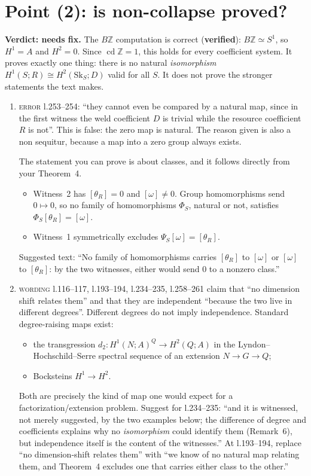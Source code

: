 \documentclass[11pt]{article}
\newcommand{\Z}{\mathbb{Z}}
\newcommand{\iss}[1]{\textsc{#1}}
\begin{document}
\section{Point (2): is non-collapse proved?}
\textbf{Verdict: needs fix.} The $B\Z$ computation is correct (\textbf{verified}): $B\Z\simeq
S^1$, so $H^1=A$ and $H^2=0$. Since $\operatorname{cd}\Z=1$, this holds for every coefficient
system. It proves exactly one thing: there is no natural \emph{isomorphism}
$H^1(S;R)\cong H^2(\mathrm{Sk}_S;D)$ valid for all $S$. It does not prove the stronger statements
the text makes.

\begin{enumerate}[label=\textbf{2.\arabic*},leftmargin=*]
\item \iss{error} l.253--254: ``they cannot even be compared by a natural map, since in the first
witness the weld coefficient $D$ is trivial while the resource coefficient $R$ is not''. This is
false: the zero map is natural. The reason given is also a non sequitur, because a map into a zero
group always exists.

The statement you can prove is about classes, and it follows directly from your Theorem~4.
\begin{itemize}[leftmargin=1.2em]
\item Witness~2 has $[\theta_R]=0$ and $[\omega]\ne0$. Group homomorphisms send $0\mapsto0$, so no
family of homomorphisms $\Phi_S$, natural or not, satisfies $\Phi_S[\theta_R]=[\omega]$.
\item Witness~1 symmetrically excludes $\Psi_S[\omega]=[\theta_R]$.
\end{itemize}
Suggested text: ``No family of homomorphisms carries $[\theta_R]$ to $[\omega]$ or $[\omega]$ to
$[\theta_R]$: by the two witnesses, either would send $0$ to a nonzero class.''

\item \iss{wording} l.116--117, l.193--194, l.234--235, l.258--261 claim that ``no dimension shift
relates them'' and that they are independent ``because the two live in different degrees''.
Different degrees do not imply independence. Standard degree-raising maps exist:
\begin{itemize}[leftmargin=1.2em]
\item the transgression $d_2\colon H^1(N;A)^Q\to H^2(Q;A)$ in the Lyndon--Hochschild--Serre
spectral sequence of an extension $N\to G\to Q$;
\item Bocksteins $H^1\to H^2$.
\end{itemize}
Both are precisely the kind of map one would expect for a factorization/extension problem. Suggest
for l.234--235: ``and it is witnessed, not merely suggested, by the two examples below; the
difference of degree and coefficients explains why no \emph{isomorphism} could identify them
(Remark~6), but independence itself is the content of the witnesses.'' At l.193--194, replace ``no
dimension-shift relates them'' with ``we know of no natural map relating them, and Theorem~4
excludes one that carries either class to the other.''


\end{enumerate}
\end{document}
